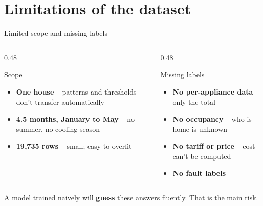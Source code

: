 \documentclass[aspectratio=169,11pt]{beamer}
\newcommand{\warn}[1]{{\color{accent}\textbf{#1}}}
\begin{document}
\section{Limitations of the dataset}

\begin{frame}{Limited scope and missing labels}
  \begin{columns}[T]
    \begin{column}{0.48\textwidth}
      \begin{block}{Scope}
        \begin{itemize}\setlength{\itemsep}{0.4em}
          \item \textbf{One house} -- patterns and thresholds don't transfer automatically
          \item \textbf{4.5 months, January to May} -- no summer, no cooling season
          \item \textbf{19,735 rows} -- small; easy to overfit
        \end{itemize}
      \end{block}
    \end{column}
    \begin{column}{0.48\textwidth}
      \begin{block}{Missing labels}
        \begin{itemize}\setlength{\itemsep}{0.4em}
          \item \textbf{No per-appliance data} -- only the total
          \item \textbf{No occupancy} -- who is home is unknown
          \item \textbf{No tariff or price} -- cost can't be computed
          \item \textbf{No fault labels}
        \end{itemize}
      \end{block}
    \end{column}
  \end{columns}
  \vspace{1em}
  \centering\small A model trained naively will \warn{guess} these answers fluently. That is the main risk.
\end{frame}
\end{document}
